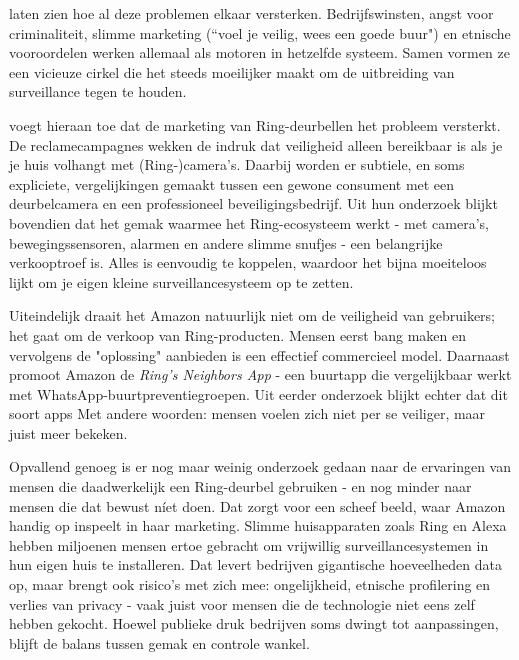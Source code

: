 \documentclass[nonacm, sigconf]{acmart}
\begin{document}
    \noindent \citeauthor{selinger2022amazon} laten zien hoe al deze problemen elkaar versterken.
    Bedrijfswinsten, angst voor criminaliteit, slimme marketing (``voel je veilig, wees een goede buur") en etnische vooroordelen werken allemaal als motoren in hetzelfde systeem.
    Samen vormen ze een vicieuze cirkel die het steeds moeilijker maakt om de uitbreiding van surveillance tegen te houden.

    \noindent \citeauthor{kelly2023ring} voegt hieraan toe dat de marketing van Ring-deurbellen het probleem versterkt.
    De reclamecampagnes wekken de indruk dat veiligheid alleen bereikbaar is als je je huis volhangt met (Ring-)camera's.
    Daarbij worden er subtiele, en soms expliciete, vergelijkingen gemaakt tussen een gewone consument met een deurbelcamera en een professioneel beveiligingsbedrijf.
    Uit hun onderzoek blijkt bovendien dat het gemak waarmee het Ring-ecosysteem werkt - met camera's, bewegingssensoren, alarmen en andere slimme snufjes - een belangrijke verkooptroef is.
    Alles is eenvoudig te koppelen, waardoor het bijna moeiteloos lijkt om je eigen kleine surveillancesysteem op te zetten.

    \noindent Uiteindelijk draait het Amazon natuurlijk niet om de veiligheid van gebruikers; het gaat om de verkoop van Ring-producten.
    Mensen eerst bang maken en vervolgens de "oplossing" aanbieden is een effectief commercieel model.
    Daarnaast promoot Amazon de \textit{Ring's Neighbors App} - een buurtapp die vergelijkbaar werkt met WhatsApp-buurtpreventiegroepen.
    Uit eerder onderzoek blijkt echter dat dit soort apps
    Met andere woorden: mensen voelen zich niet per se veiliger, maar juist meer bekeken.

    \noindent Opvallend genoeg is er nog maar weinig onderzoek gedaan naar de ervaringen van mensen die daadwerkelijk een Ring-deurbel gebruiken - en nog minder naar mensen die dat bewust níet doen.
    Dat zorgt voor een scheef beeld, waar Amazon handig op inspeelt in haar marketing.
    Slimme huisapparaten zoals Ring en Alexa hebben miljoenen mensen ertoe gebracht om vrijwillig surveillancesystemen in hun eigen huis te installeren.
    Dat levert bedrijven gigantische hoeveelheden data op, maar brengt ook risico's met zich mee: ongelijkheid, etnische profilering en verlies van privacy - vaak juist voor mensen die de technologie niet eens zelf hebben gekocht.
    Hoewel publieke druk bedrijven soms dwingt tot aanpassingen, blijft de balans tussen gemak en controle wankel.
\end{document}
